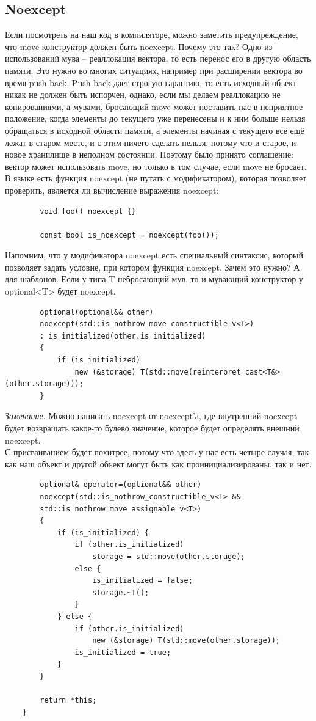 \documentclass[12pt, a4paper]{article}
\begin{document}
	\subsection{Noexcept}
	Если посмотреть на наш код в компиляторе, можно заметить предупреждение, что move конструктор должен быть noexcept. Почему это так? Одно из использований мува -- реаллокация вектора, то есть перенос его в другую область памяти. Это нужно во многих ситуациях, например при расширении вектора во время push back. Push back дает строгую гарантию, то есть исходный объект никак не должен быть испорчен, однако, если мы делаем реаллокацию не копированиями, а мувами, бросающий move может поставить нас в неприятное положение, когда элементы до текущего уже перенесены и к ним больше нельзя обращаться в исходной области памяти, а элементы начиная с текущего всё ещё лежат в старом месте, и с этим ничего сделать нельзя, потому что и старое, и новое хранилище в неполном состоянии. Поэтому было принято соглашение: вектор может использовать move, но только в том случае, если move не бросает. В языке есть функция noexcept (не путать с модификатором), которая позволяет проверить, является ли вычисление выражения noexcept:
	\begin{verbatim}
		void foo() noexcept {}
		
		const bool is_noexcept = noexcept(foo());
	\end{verbatim}
	Напомним, что у модификатора noexcept есть специальный синтаксис, который позволяет задать условие, при котором функция noexcept. Зачем это нужно? А для шаблонов. Если у типа T небросающий мув, то и мувающий конструктор у optional<T> будет noexcept.
	\begin{verbatim}
		optional(optional&& other) 
		noexcept(std::is_nothrow_move_constructible_v<T>)
		: is_initialized(other.is_initialized)
		{
			if (is_initialized)
				new (&storage) T(std::move(reinterpret_cast<T&>(other.storage)));
		}
	\end{verbatim}
	\textit{Замечание}. Можно написать noexcept от noexcept'а, где внутренний noexcept будет возвращать какое-то булево значение, которое будет определять внешний noexcept.
	\\ С присваиванием будет похитрее, потому что здесь у нас есть четыре случая, так как наш объект и другой объект могут быть как проинициализированы, так и нет.
	\begin{verbatim}
		optional& operator=(optional&& other) 
		noexcept(std::is_nothrow_constructible_v<T> &&
		std::is_nothrow_move_assignable_v<T>)
		{
			if (is_initialized) {
				if (other.is_initialized)
					storage = std::move(other.storage);
				else {
					is_initialized = false;
					storage.~T();
				}
			} else {
				if (other.is_initialized)
					new (&storage) T(std::move(other.storage));
				is_initialized = true;
			}
		}
		
		return *this;
	}
\end{verbatim}
\end{document}
